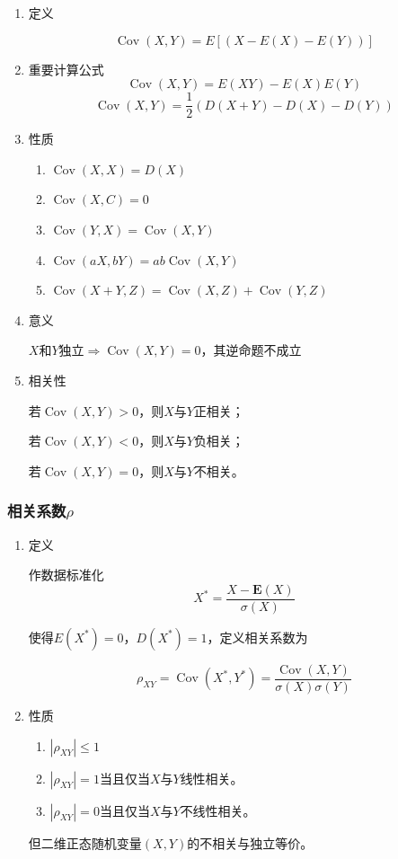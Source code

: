 \documentclass[UTF8,fontset=fandol,zihao=5]{ctexart}
\newcommand{\vect}[1]{\bm{#1}}
\newcommand{\Cov}{\operatorname{Cov}}
\begin{document}
\begin{enumerate}
  \item 定义

  \[
  \operatorname{Cov}(X,Y) = E[(X-E(X)- E(Y))]
  \]

  \item 重要计算公式
  \[
  \operatorname{Cov}(X,Y) = E(XY) - E(X)E(Y)
  \]
  \[
  \operatorname{Cov}(X, Y) = \frac{1}{2} (D(X+Y) - D(X) - D(Y))
  \]

  \item 性质
  \begin{enumerate}[label=(\arabic*)]
    \item $\operatorname{Cov}(X,X) = D(X)$
    \item $\operatorname{Cov}(X,C) = 0$
    \item $\operatorname{Cov}(Y,X) = \operatorname{Cov}(X,Y)$
    \item $\operatorname{Cov}(aX,bY) = ab \operatorname{Cov}(X,Y)$
    \item $\operatorname{Cov}(X+Y,Z) = \operatorname{Cov}(X,Z) + \operatorname{Cov}(Y,Z)$
  \end{enumerate}

  \item 意义
  
  $X\text{和}Y\text{独立} \Longrightarrow \Cov (X, Y)=0$，其逆命题不成立

  \item 相关性
  
  若$\Cov (X, Y)>0$，则$X$与$Y$正相关；
  
  若$\Cov (X, Y)<0$，则$X$与$Y$负相关；
  
  若$\Cov (X, Y)=0$，则$X$与$Y$不相关。
\end{enumerate}

\subsubsection{相关系数$\rho$}
\begin{enumerate}
  \item 定义 

  作数据标准化
  \[
  X^{\ast} = \frac{X-\vect E(X)}{\sigma (X)}
  \]

  使得$E(X^{\ast})=0$，$D(X^{\ast})=1$，定义相关系数为

  \[
  \rho_{XY} = \Cov(X^{\ast}, Y^{\ast}) = \frac{\Cov(X, Y)}{\sigma(X)\sigma(Y)}
  \]
  
  \item 性质
  \begin{enumerate}[label=(\arabic*)]
    \item $|\rho_{XY}| \leq 1$
    \item $|\rho_{XY}|=1$当且仅当$X$与$Y$线性相关。
    \item $|\rho_{XY}|=0$当且仅当$X$与$Y$不线性相关。
  \end{enumerate}

  但二维正态随机变量$(X,Y)$的不相关与独立等价。
\end{enumerate}
\end{document}
